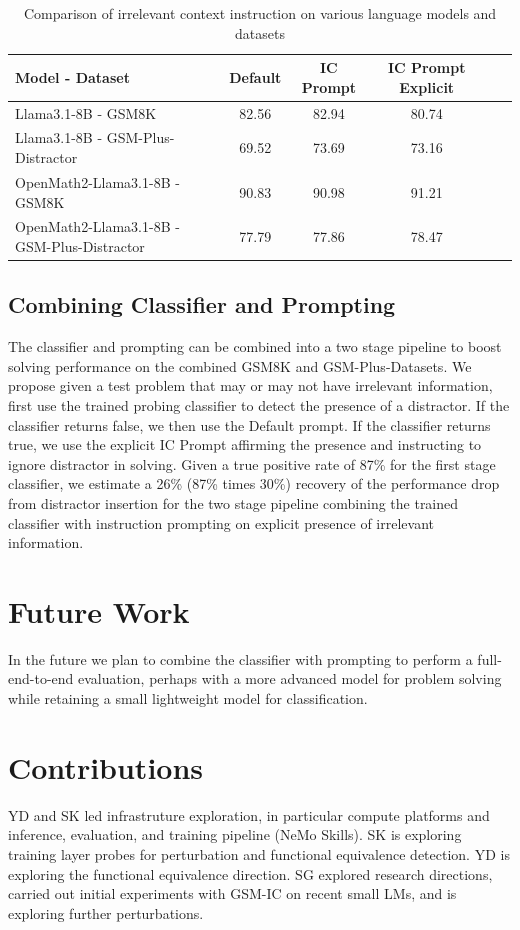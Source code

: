 \documentclass{article}
\begin{document}
\begin{table}[h!]
    \centering
    \begin{tabular}{l c c c c c}
        \toprule
        \textbf{Model - Dataset} & \textbf{Default} & \textbf{IC Prompt} & \textbf{IC Prompt Explicit} \\
        \midrule
        Llama3.1-8B - GSM8K & 82.56 & 82.94 &  80.74   \\
        Llama3.1-8B - GSM-Plus-Distractor & 69.52 & 73.69 & 73.16 \\
        OpenMath2-Llama3.1-8B - GSM8K & 90.83 & 90.98 & 91.21  \\
        OpenMath2-Llama3.1-8B - GSM-Plus-Distractor & 77.79 & 77.86 & 78.47 \\
        \bottomrule
    \end{tabular}
    \caption{Comparison of irrelevant context instruction on various language models and datasets}
    \label{tab:prompt_metrics}
\end{table}

\subsection{Combining Classifier and Prompting}
The classifier and prompting can be combined into a two stage pipeline to boost solving performance on the combined GSM8K and GSM-Plus-Datasets. We propose given a test problem that may or may not have irrelevant information, first use the trained probing classifier to detect the presence of a distractor. If the classifier returns false, we then use the Default prompt. If the classifier returns true, we use the explicit IC Prompt affirming the presence and instructing to ignore distractor in solving. Given a true positive rate of 87\% for the first stage classifier, we estimate a 26\% (87\% times 30\%) recovery of the performance drop from distractor insertion for the two stage pipeline combining the trained classifier with instruction prompting on explicit presence of irrelevant information.

\section{Future Work}
In the future we plan to combine the classifier with prompting to perform a full-end-to-end evaluation, perhaps with a more advanced model for problem solving while retaining a small lightweight model for classification. 

\section{Contributions}
YD and SK led infrastruture exploration, in particular compute platforms and inference, evaluation, and training pipeline (NeMo Skills). SK is exploring training layer probes for perturbation and functional equivalence detection. YD is exploring the functional equivalence direction.  SG explored research directions, carried out initial experiments with GSM-IC on recent small LMs, and is exploring further perturbations.
\end{document}
